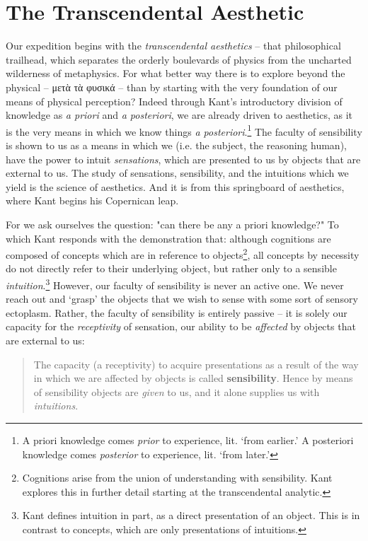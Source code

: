 \section*{The Transcendental Aesthetic}
Our expedition begins with the \emph{transcendental aesthetics} -- that philosophical trailhead, which separates the orderly boulevards of physics from the uncharted wilderness of metaphysics. For what better way there is to explore beyond the physical -- μετὰ τὰ φυσικά -- than by starting with the very foundation of our means of physical perception? Indeed through Kant's introductory division of knowledge as \emph{a priori} and \emph{a posteriori}, we are already driven to aesthetics, as it is the very means in which we know things \emph{a posteriori}.\footnote{A priori knowledge comes \emph{prior} to experience, lit. `from earlier.' A posteriori knowledge comes \emph{posterior} to experience, lit. `from later.'} The faculty of sensibility is shown to us as a means in which we (i.e. the subject, the reasoning human), have the power to intuit \emph{sensations}, which are presented to us by objects that are external to us. The study of sensations, sensibility, and the intuitions which we yield is the science of aesthetics. And it is from this springboard of aesthetics, where Kant begins his Copernican leap.

For we ask ourselves the question: "can there be any a priori knowledge?" To which Kant responds with the demonstration that: although cognitions are composed of concepts which are in reference to objects\footnote{Cognitions arise from the union of understanding with sensibility. Kant explores this in further detail starting at the transcendental analytic.}, all concepts by necessity do not directly refer to their underlying object, but rather only to a sensible \emph{intuition}.\footnote{Kant defines intuition in part, as a direct presentation of an object. This is in contrast to concepts, which are only presentations of intuitions.} However, our faculty of sensibility is never an active one. We never reach out and `grasp' the objects that we wish to sense with some sort of sensory ectoplasm. Rather, the faculty of sensibility is entirely passive -- it is solely our capacity for the \emph{receptivity} of sensation, our ability to be \emph{affected} by objects that are external to us:

\begin{quote}
The capacity (a receptivity) to acquire presentations as a result of the way in which we are affected by objects is called \textbf{sensibility}. Hence by means of sensibility objects are \emph{given} to us, and it alone supplies us with \emph{intuitions}.

\autocite[B33]{hackett}
\end{quote}

